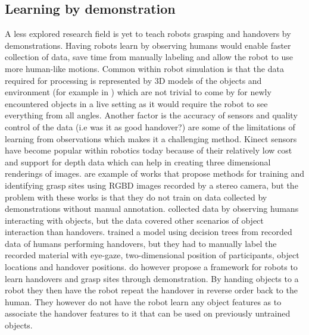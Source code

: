 \subsection{Learning by demonstration}
A less explored research field is yet to teach robots grasping and handovers by demonstrations. Having robots learn by observing humans would enable faster collection of data, save time from manually labeling and allow the robot to use more human-like motions. Common within robot simulation is that the data required for processing is represented by 3D models of the objects and environment (for example in \parencite{Miller2003}) which are not trivial to come by for newly encountered objects in a live setting as it would require the robot to see everything from all angles. Another factor is the accuracy of sensors and quality control of the data (i.e was it as good handover?) are some of the limitations of learning from observations which makes it a challenging method. Kinect sensors have become popular within robotics today because of their relatively low cost and support for depth data which can help in creating three dimensional renderings of images. \parencite{Lenz2015} \parencite{Redmon2014} \parencite{Jiang2011} \parencite{Saxena2008} are example of works that propose methods for training and identifying grasp sites using RGBD images recorded by a stereo camera, but the problem with these works is that they do not train on data collected by demonstrations without manual annotation. \textcite{Chan2014} collected data by observing humans interacting with objects, but the data covered other scenarios of object interaction than handovers. \textcite{Strabala2013} trained a model using decision trees from recorded data of humans performing handovers, but they had to manually label the recorded material with eye-gaze, two-dimensional position of participants, object locations and handover positions. \textcite{Chan2015a} do however propose a framework for robots to learn handovers and grasp sites through demonstration. By handing objects to a robot they then have the robot repeat the handover in reverse order back to the human. They however do not have the robot learn any object features as to associate the handover features to it that can be used on previously untrained objects.


